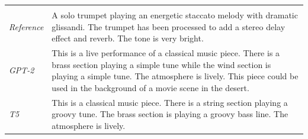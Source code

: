 \begin{table}[ht]
\begin{tabularx}{\textwidth}{lX}
\multicolumn{2}{l}{} \\[-0.5em]
\textit{Reference} & A solo trumpet playing an energetic staccato melody with dramatic glissandi. The trumpet has been processed to add a stereo delay effect and reverb. The tone is very bright. \\
\textit{GPT-2} & This is a live performance of a classical music piece. There is a brass section playing a simple tune while the wind section is playing a simple tune. The atmosphere is lively. This piece could be used in the background of a movie scene in the desert. \\
\textit{T5} & This is a classical music piece. There is a string section playing a groovy tune. The brass section is playing a groovy bass line. The atmosphere is lively. \\
\midrule

\bottomrule
\end{tabularx}
\end{table}

